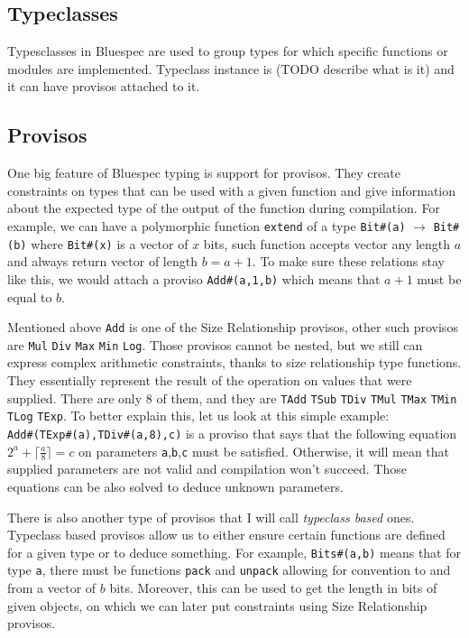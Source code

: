 \documentclass[12pt]{report}
\begin{document}
\subsection{Typeclasses}
\label{sec:Typeclasses}
Typesclasses in Bluespec are used to group types for which specific functions or modules are implemented. Typeclass instance is (TODO describe what is it) and it can have provisos attached to it.

\subsection{Provisos}
\label{sec:Provisos}
One big feature of Bluespec typing is support for provisos. They create constraints on types that can be used with a given function and give information about the expected type of the output of the function during compilation. For example, we can have a polymorphic function \verb!extend! of a type \verb!Bit#(a)! $\rightarrow$ \verb!Bit#(b)! where \verb!Bit#(x)! is a vector of $x$ bits, such function accepts vector any length $a$ and always return vector of length $b=a+1$. To make sure these relations stay like this, we would attach a proviso \verb!Add#(a,1,b)! which means that $a+1$ must be equal to $b$.  
\par  
Mentioned above \verb!Add! is one of the Size Relationship provisos, other such provisos are \verb!Mul! \verb!Div! \verb!Max! \verb!Min! \verb!Log!.  
Those provisos cannot be nested, but we still can express complex arithmetic constraints, thanks to size relationship type functions.  
They essentially represent the result of the operation on values that were supplied. There are only 8 of them, and they are \verb!TAdd! \verb!TSub! \verb!TDiv! \verb!TMul! \verb!TMax! \verb!TMin! \verb!TLog! \verb!TExp!.  
To better explain this, let us look at this simple example: \\  
\verb!Add#(TExp#(a),TDiv#(a,8),c)! is a proviso that says that the following equation $2^a+\lceil\frac{a}{8}\rceil = c$ on parameters \verb!a!,\verb!b!,\verb!c! must be satisfied. Otherwise, it will mean that supplied parameters are not valid and compilation won't succeed. Those equations can be also solved to deduce unknown parameters.  
\par  
There is also another type of provisos that I will call \emph{typeclass based} ones.  
Typeclass based provisos allow us to either ensure certain functions are defined for a given type or to deduce something. For example, \verb!Bits#(a,b)! means that for type \verb!a!, there must be functions \verb!pack! and \verb!unpack! allowing for convention to and from a vector of $b$ bits. Moreover, this can be used to get the length in bits of given objects, on which we can later put constraints using Size Relationship provisos.  
\end{document}
